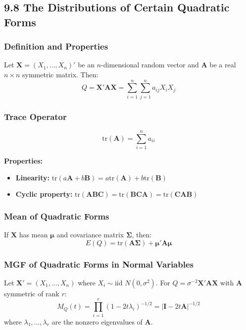 \subsection{9.8 The Distributions of Certain Quadratic Forms}

\subsubsection{Definition and Properties}

\begin{definition}
Let $\mathbf{X} = (X_1, \ldots, X_n)'$ be an $n$-dimensional random vector and $\mathbf{A}$ be a real $n \times n$ symmetric matrix. Then:
\[
Q = \mathbf{X}'\mathbf{A}\mathbf{X} = \sum_{i=1}^n \sum_{j=1}^n a_{ij}X_i X_j
\]
\end{definition}
\subsubsection{Trace Operator}
\[
\text{tr}(\mathbf{A}) = \sum_{i=1}^n a_{ii}
\]

\textbf{Properties:}

\begin{itemize}
	\item \textbf{Linearity:} $\text{tr}(a\mathbf{A} + b\mathbf{B}) = a\text{tr}(\mathbf{A}) + b\text{tr}(\mathbf{B})$
	\item \textbf{Cyclic property:} $\text{tr}(\mathbf{ABC}) = \text{tr}(\mathbf{BCA}) = \text{tr}(\mathbf{CAB})$
\end{itemize}

\subsubsection{Mean of Quadratic Forms}

\begin{theorem}
If $\mathbf{X}$ has mean $\boldsymbol{\mu}$ and covariance matrix $\boldsymbol{\Sigma}$, then:
\[
E(Q) = \text{tr}(\mathbf{A}\boldsymbol{\Sigma}) + \boldsymbol{\mu}'\mathbf{A}\boldsymbol{\mu}
\]
\end{theorem}
\subsubsection{MGF of Quadratic Forms in Normal Variables}

\begin{theorem}
Let $\mathbf{X}' = (X_1, \ldots, X_n)$ where $X_i \sim \text{iid } N(0, \sigma^2)$. For $Q = \sigma^{-2}\mathbf{X}'\mathbf{A}\mathbf{X}$ with $\mathbf{A}$ symmetric of rank $r$:
\[
M_Q(t) = \prod_{i=1}^r (1-2t\lambda_i)^{-1/2} = |\mathbf{I} - 2t\mathbf{A}|^{-1/2}
\]
where $\lambda_1, \ldots, \lambda_r$ are the nonzero eigenvalues of $\mathbf{A}$.
\end{theorem}
